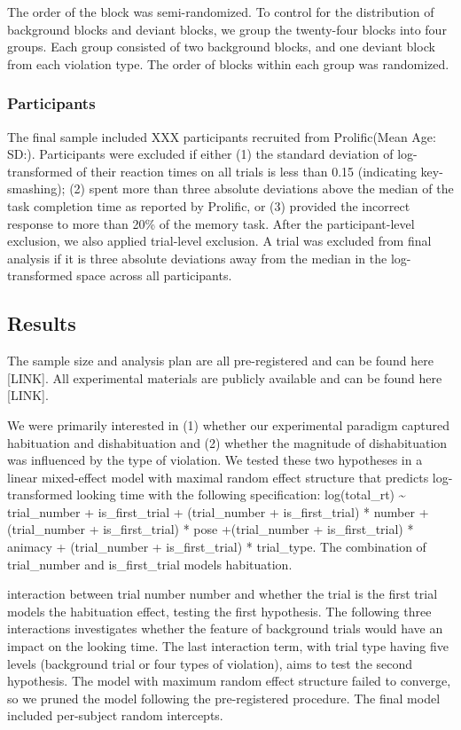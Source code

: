 \documentclass[10pt, letterpaper]{article}
\begin{document}
The order of the block was semi-randomized. To control for the
distribution of background blocks and deviant blocks, we group the
twenty-four blocks into four groups. Each group consisted of two
background blocks, and one deviant block from each violation type. The
order of blocks within each group was randomized.

\hypertarget{participants}{%
\subsubsection{Participants}\label{participants}}

The final sample included XXX participants recruited from Prolific(Mean
Age: SD:). Participants were excluded if either (1) the standard
deviation of log-transformed of their reaction times on all trials is
less than 0.15 (indicating key-smashing); (2) spent more than three
absolute deviations above the median of the task completion time as
reported by Prolific, or (3) provided the incorrect response to more
than 20\% of the memory task. After the participant-level exclusion, we
also applied trial-level exclusion. A trial was excluded from final
analysis if it is three absolute deviations away from the median in the
log-transformed space across all participants.

\hypertarget{results}{%
\subsection{Results}\label{results}}

The sample size and analysis plan are all pre-registered and can be
found here {[}LINK{]}. All experimental materials are publicly available
and can be found here {[}LINK{]}.

We were primarily interested in (1) whether our experimental paradigm
captured habituation and dishabituation and (2) whether the magnitude of
dishabituation was influenced by the type of violation. We tested these
two hypotheses in a linear mixed-effect model with maximal random effect
structure that predicts log-transformed looking time with the following
specification: log(total\_rt) \textasciitilde{} trial\_number +
is\_first\_trial + (trial\_number + is\_first\_trial) * number +
(trial\_number + is\_first\_trial) * pose +(trial\_number +
is\_first\_trial) * animacy + (trial\_number + is\_first\_trial) *
trial\_type. The combination of trial\_number and is\_first\_trial
models habituation.

interaction between trial number number and whether the trial is the
first trial models the habituation effect, testing the first hypothesis.
The following three interactions investigates whether the feature of
background trials would have an impact on the looking time. The last
interaction term, with trial type having five levels (background trial
or four types of violation), aims to test the second hypothesis. The
model with maximum random effect structure failed to converge, so we
pruned the model following the pre-registered procedure. The final model
included per-subject random intercepts.
\end{document}

